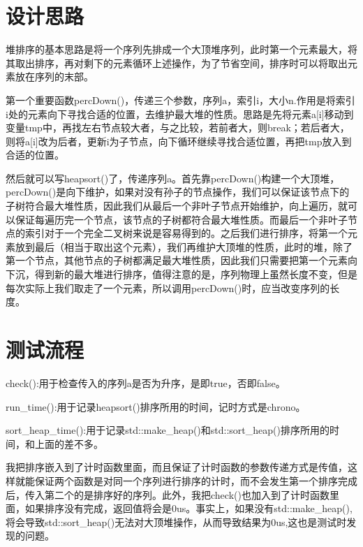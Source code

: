 \documentclass[UTF8]{ctexart}
\begin{document}
	\pagestyle{fancy}
	\fancyhead{}
	\section{设计思路}
	\hspace{0em}堆排序的基本思路是将一个序列先排成一个大顶堆序列，此时第一个元素最大，将其取出排序，再对剩下的元素循环上述操作，为了节省空间，排序时可以将取出元素放在序列的末部。
	
	\hspace{0em}第一个重要函数percDown()，传递三个参数，序列a，索引i，大小n.作用是将索引i处的元素向下寻找合适的位置，去维护最大堆的性质。思路是先将元素a[i]移动到变量tmp中，再找左右节点较大者，与之比较，若前者大，则break；若后者大，则将a[i]改为后者，更新i为子节点，向下循环继续寻找合适位置，再把tmp放入到合适的位置。
	
	\hspace{0em}然后就可以写heapsort()了，传递序列a。首先靠percDown()构建一个大顶堆，percDown()是向下维护，如果对没有孙子的节点操作，我们可以保证该节点下的子树符合最大堆性质，因此我们从最后一个非叶子节点开始维护，向上遍历，就可以保证每遍历完一个节点，该节点的子树都符合最大堆性质。而最后一个非叶子节点的索引对于一个完全二叉树来说是容易得到的。之后我们进行排序，将第一个元素放到最后（相当于取出这个元素），我们再维护大顶堆的性质，此时的堆，除了第一个节点，其他节点的子树都满足最大堆性质，因此我们只需要把第一个元素向下沉，得到新的最大堆进行排序，值得注意的是，序列物理上虽然长度不变，但是每次实际上我们取走了一个元素，所以调用percDown()时，应当改变序列的长度。
	
	\section{测试流程}
	\hspace{0em}check():用于检查传入的序列a是否为升序，是即true，否即false。
	
	\hspace{0em}run\_time():用于记录heapsort()排序所用的时间，记时方式是chrono。
	
	\hspace{0em}sort\_heap\_time():用于记录std::make\_heap()和std::sort\_heap()排序所用的时间，和上面的差不多。
	
	\hspace{0em}我把排序嵌入到了计时函数里面，而且保证了计时函数的参数传递方式是传值，这样就能保证两个函数是对同一个序列进行排序的计时，而不会发生第一个排序完成后，传入第二个的是排序好的序列。此外，我把check()也加入到了计时函数里面，如果排序没有完成，返回值将会是0us。事实上，如果没有std::make\_heap(),将会导致std::sort\_heap()无法对大顶堆操作，从而导致结果为0us,这也是测试时发现的问题。
	
\end{document}
